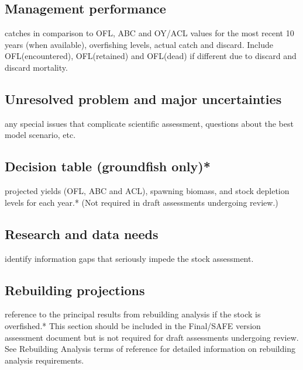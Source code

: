 \documentclass[12pt,]{article}
\begin{document}
\subsection*{Management performance}\label{management-performance}

catches in comparison to OFL, ABC and OY/ACL values for the most recent
10 years (when available), overfishing levels, actual catch and discard.
Include OFL(encountered), OFL(retained) and OFL(dead) if different due
to discard and discard mortality.

\subsection*{Unresolved problem and major
uncertainties}\label{unresolved-problem-and-major-uncertainties}

any special issues that complicate scientific assessment, questions
about the best model scenario, etc.

\subsection*{Decision table (groundfish
only)*}\label{decision-table-groundfish-only}

projected yields (OFL, ABC and ACL), spawning biomass, and stock
depletion levels for each year.* (Not required in draft assessments
undergoing review.)

\subsection*{Research and data needs}\label{research-and-data-needs}

identify information gaps that seriously impede the stock assessment.

\subsection*{Rebuilding projections}\label{rebuilding-projections}

reference to the principal results from rebuilding analysis if the stock
is overfished.* This section should be included in the Final/SAFE
version assessment document but is not required for draft assessments
undergoing review. See Rebuilding Analysis terms of reference for
detailed information on rebuilding analysis requirements.
\end{document}
